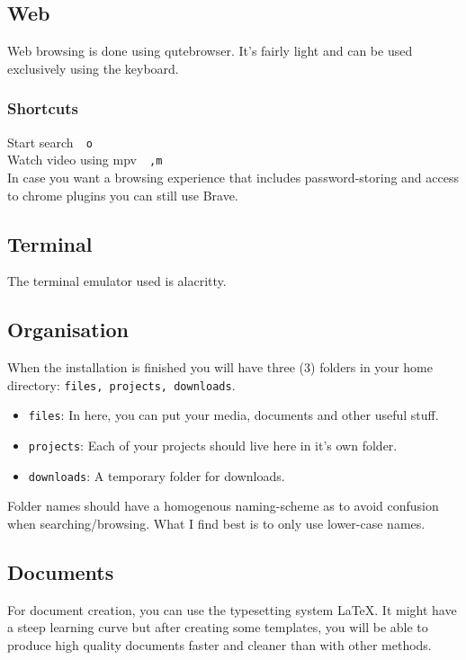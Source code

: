 \documentclass{article}
\newcommand{\ttt}[1]{\texttt{#1}}
\newcommand{\shortcut}[2]{#1~\dotfill{}~\ttt{#2}\\} %
\newcommand{\terminalemulator}{alacritty}
\newcommand{\browser}{qutebrowser}
\newcommand{\altbrowser}{Brave}
\newcommand{\videoplayer}{mpv}
\begin{document}
\subsection{Web}

Web browsing is done using \browser. It's fairly light and can be used 
exclusively using the keyboard.

\subsubsection{Shortcuts}

\shortcut{Start search}{o}
\shortcut{Watch video using \videoplayer}{,m}

In case you want a browsing experience that includes password-storing 
and access to chrome plugins you can still use \altbrowser.

\subsection{Terminal}

The terminal emulator used is \terminalemulator.

\subsection{Organisation}

When the installation is finished you will have three (3)
folders in your home directory: \ttt{files, projects, downloads}.

\begin{itemize}
    \item \ttt{files}: In here, you can put your media, documents and other useful stuff.
    \item \ttt{projects}: Each of your projects should live here in it's own folder.
    \item \ttt{downloads}: A temporary folder for downloads.
\end{itemize}

Folder names should have a homogenous naming-scheme as to avoid confusion when 
searching/browsing. What I find best is to only use lower-case names.

\subsection{Documents}

For document creation, you can use the typesetting system \LaTeX. 
It might have a steep learning curve but after creating some templates, 
you will be able to produce high quality documents faster and cleaner 
than with other methods.
\end{document}

